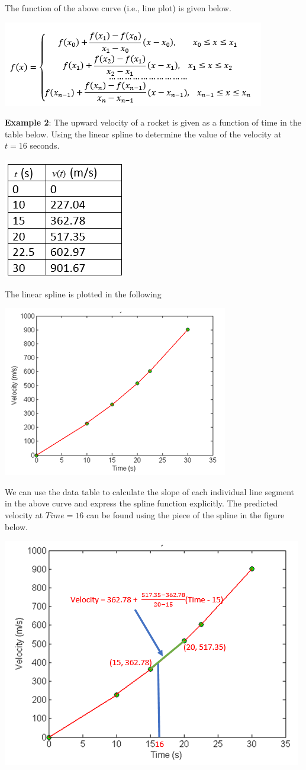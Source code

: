 \documentclass[
]{book}
\begin{document}
The function of the above curve (i.e., line plot) is given below.

\begin{center}\includegraphics[width=0.55\linewidth]{img10/04-oneDegSplineEquation} \end{center}

\textbf{Example 2}: The upward velocity of a rocket is given as a function of time in the table below. Using the linear spline to determine the value of the velocity at \(t = 16\) seconds.

\begin{center}\includegraphics[width=0.2\linewidth]{img10/05-VelocityData} \end{center}

The linear spline is plotted in the following

\begin{center}\includegraphics[width=0.4\linewidth]{img10/06-VelocityLinearSplineCurve} \end{center}

We can use the data table to calculate the slope of each individual line segment in the above curve and express the spline function explicitly. The predicted velocity at \(Time = 16\) can be found using the piece of the spline in the figure below.

\begin{center}\includegraphics[width=0.4\linewidth]{img10/07-VelocityLinearSplinePred} \end{center}
\end{document}
